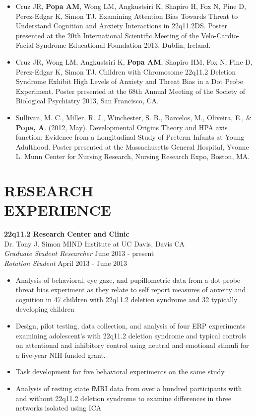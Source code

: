 \documentclass[line,margin,10pt]{res}
\begin{document}
\begin{resume}
\begin{itemize}
\item Cruz JR, \textbf{Popa AM}, Wong LM, Angkustsiri K, Shapiro H, Fox N, Pine D, Perez-Edgar K, Simon TJ. Examining Attention Bias Towards Threat to Understand Cognition and Anxiety Interactions in 22q11.2DS. Poster presented at the 20th International Scientific Meeting of the Velo-Cardio-Facial Syndrome Educational Foundation 2013, Dublin, Ireland.
\item Cruz JR, Wong LM, Angkustsiri K, \textbf{Popa AM}, Shapiro HM, Fox N, Pine D, Perez-Edgar K, Simon TJ. Children with Chromosome 22q11.2 Deletion Syndrome Exhibit High Levels of Anxiety and Threat Bias in a Dot Probe Experiment. Poster presented at the 68th Annual Meeting of the Society of Biological Psychiatry 2013, San Francisco, CA.
\item Sullivan, M. C., Miller, R. J., Winchester, S. B., Barcelos, M., Oliveira, E., \& \textbf{Popa, A}. (2012, May). Developmental Origins Theory and HPA axis function: Evidence from a Longitudinal Study of Preterm Infants at Young Adulthood.  Poster presented at the Massachusetts General Hospital, Yvonne L. Munn Center for Nursing Research, Nursing Research Expo, Boston, MA.
\end{itemize}



\section{RESEARCH \\ EXPERIENCE}
\textbf{22q11.2 Research Center and Clinic}\\
Dr. Tony J. Simon \hfill MIND Institute at UC Davis, Davis CA\\{\sl Graduate Student Researcher} \hfill June 2013 - present\\ {\sl Rotation Student} \hfill April 2013 - June 2013
\begin{itemize} \itemsep -2pt
\item Analysis of behavioral, eye gaze, and pupillometric data from a dot probe threat bias experiment as they relate to self report measures of anxeity and cognition in 47 children with 22q11.2 deletion syndrome and 32 typically developing children
\item Design, pilot testing, data collection, and analysis of four ERP experiments examining adolescent's with 22q11.2 deletion syndrome and typical controls on attentional and inhibitory control using neutral and emotional stimuli for a five-year NIH funded grant.
\item Task development for five behavioral experiments on the same study
\item Analysis of resting state fMRI data from over a hundred participants with and without 22q11.2 deletion syndrome to examine differences in three networks isolated using ICA


\end{itemize}
\end{resume}
\end{document}
